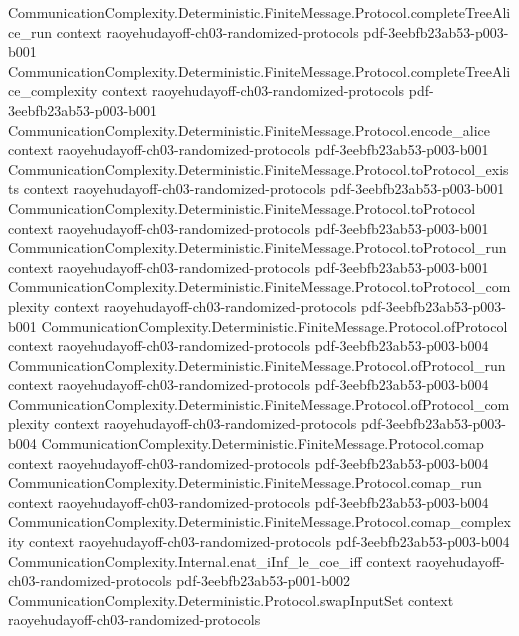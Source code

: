 \begin{theorem}
\proofstep
  {CommunicationComplexity.Deterministic.FiniteMessage.Protocol.completeTreeAlice_run}
  {context}
  {raoyehudayoff-ch03-randomized-protocols}
  {pdf-3eebfb23ab53-p003-b001}
\proofstep
  {CommunicationComplexity.Deterministic.FiniteMessage.Protocol.completeTreeAlice_complexity}
  {context}
  {raoyehudayoff-ch03-randomized-protocols}
  {pdf-3eebfb23ab53-p003-b001}
\proofstep
  {CommunicationComplexity.Deterministic.FiniteMessage.Protocol.encode_alice}
  {context}
  {raoyehudayoff-ch03-randomized-protocols}
  {pdf-3eebfb23ab53-p003-b001}
\proofstep
  {CommunicationComplexity.Deterministic.FiniteMessage.Protocol.toProtocol_exists}
  {context}
  {raoyehudayoff-ch03-randomized-protocols}
  {pdf-3eebfb23ab53-p003-b001}
\proofstep
  {CommunicationComplexity.Deterministic.FiniteMessage.Protocol.toProtocol}
  {context}
  {raoyehudayoff-ch03-randomized-protocols}
  {pdf-3eebfb23ab53-p003-b001}
\proofstep
  {CommunicationComplexity.Deterministic.FiniteMessage.Protocol.toProtocol_run}
  {context}
  {raoyehudayoff-ch03-randomized-protocols}
  {pdf-3eebfb23ab53-p003-b001}
\proofstep
  {CommunicationComplexity.Deterministic.FiniteMessage.Protocol.toProtocol_complexity}
  {context}
  {raoyehudayoff-ch03-randomized-protocols}
  {pdf-3eebfb23ab53-p003-b001}
\proofstep
  {CommunicationComplexity.Deterministic.FiniteMessage.Protocol.ofProtocol}
  {context}
  {raoyehudayoff-ch03-randomized-protocols}
  {pdf-3eebfb23ab53-p003-b004}
\proofstep
  {CommunicationComplexity.Deterministic.FiniteMessage.Protocol.ofProtocol_run}
  {context}
  {raoyehudayoff-ch03-randomized-protocols}
  {pdf-3eebfb23ab53-p003-b004}
\proofstep
  {CommunicationComplexity.Deterministic.FiniteMessage.Protocol.ofProtocol_complexity}
  {context}
  {raoyehudayoff-ch03-randomized-protocols}
  {pdf-3eebfb23ab53-p003-b004}
\proofstep
  {CommunicationComplexity.Deterministic.FiniteMessage.Protocol.comap}
  {context}
  {raoyehudayoff-ch03-randomized-protocols}
  {pdf-3eebfb23ab53-p003-b004}
\proofstep
  {CommunicationComplexity.Deterministic.FiniteMessage.Protocol.comap_run}
  {context}
  {raoyehudayoff-ch03-randomized-protocols}
  {pdf-3eebfb23ab53-p003-b004}
\proofstep
  {CommunicationComplexity.Deterministic.FiniteMessage.Protocol.comap_complexity}
  {context}
  {raoyehudayoff-ch03-randomized-protocols}
  {pdf-3eebfb23ab53-p003-b004}
\proofstep
  {CommunicationComplexity.Internal.enat_iInf_le_coe_iff}
  {context}
  {raoyehudayoff-ch03-randomized-protocols}
  {pdf-3eebfb23ab53-p001-b002}
\proofstep
  {CommunicationComplexity.Deterministic.Protocol.swapInputSet}
  {context}
  {raoyehudayoff-ch03-randomized-protocols}

\end{theorem}
